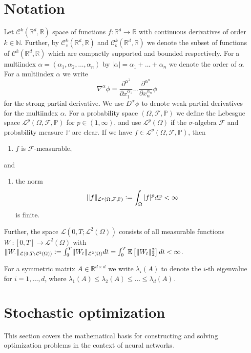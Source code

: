 \documentclass[12pt]{article}
\theoremstyle{definition}
\numberwithin{equation}{section}
\newcommand{\N}{\mathbb{N}}
\newcommand{\R}{\mathbb{R}}
\newcommand{\BP}{\mathbb{P}}
\newcommand{\CF}{\mathcal{F}}
\newcommand{\CL}{\mathcal{L}}
\newcommand{\CC}{\mathcal{C}}
\newcommand{\ev}[1]{\mathbb{E}\left[{#1}\right]}
\newcommand{\norm}[1]{\lVert{#1}\rVert_2}
\newcommand{\defeq}{\vcentcolon=}
\begin{document}
\section{Notation}
Let $\CC^k(\R^d, \R)$ space of functions $f: \R^d \rightarrow \R$ with continuous derivatives of order $k \in \N$. Further, by $\CC_c^k(\R^d, \R)$ and $\CC_b^k(\R^d, \R)$ we denote the subset of functions of $\CC^k(\R^d, \R)$ which are compactly supported and bounded respectively.
For a multiindex $\alpha = (\alpha_1, \alpha_2, \dots, \alpha_n)$ by $|\alpha| = \alpha_1 + \dots + \alpha_n$ we denote the order of $\alpha$.
For a multiindex $\alpha$ we write 
\begin{equation*}
  \nabla^{\alpha} \phi = \frac{\partial^{\alpha^1}}{\partial x_1^{\alpha_1}}\dots\frac{\partial^{\alpha^n}}{\partial x_n^{\alpha_n}} \phi
\end{equation*}
for the strong partial derivative. We use $D^{\alpha}\phi$ to denote weak partial derivatives for the multiindex $\alpha$.
For a probability space $(\Omega, \CF, \BP)$ we define the Lebesgue space $\CL^p(\Omega, \CF, \BP)$ for $p \in (1,\infty)$, and use $\CL^p(\Omega)$ if the $\sigma$-algebra $\CF$ and probability measure $\BP$ are clear. If we have $f \in\CL^p(\Omega, \CF, \BP)$, then
\begin{enumerate}[label=(\roman*)]
  \item $f$ is $\CF$-measurable,
\end{enumerate}
and
\begin{enumerate}[resume, label=(\roman*)]
  \item the norm 
  \begin{equation*}
    \lVert f \rVert_{\CL^p(\Omega, \CF, \BP)} \defeq \int_{\Omega} |f|^p d\BP < \infty
  \end{equation*}
  is finite.
\end{enumerate}
Further, the space $\CL(0,T;\CL^2(\Omega))$ consists of all measurable functions $W_{\cdot} : [0,T] \rightarrow \CL^2(\Omega)$ with $\lVert W_{\cdot} \rVert_{\CL(0,T;\CL^2(\Omega))} \defeq \int_0^T \lVert W_t \rVert_{\CL^2(\Omega)}dt = \int_0^T \ev{\norm{W_t}^2}dt < \infty$.

For a symmetric matrix $A \in \R^{d \times d}$ we write $\lambda_i(A)$ to denote the $i$-th eigenvalue for $i=1,\dots,d$, where $\lambda_1(A) \leq \lambda_2(A) \leq \dots \leq \lambda_d(A)$.
\section{Stochastic optimization}
\label{sec:Optimization}
 This section covers the mathematical basis for constructing and solving optimization problems in the context of neural networks.
\end{document}
